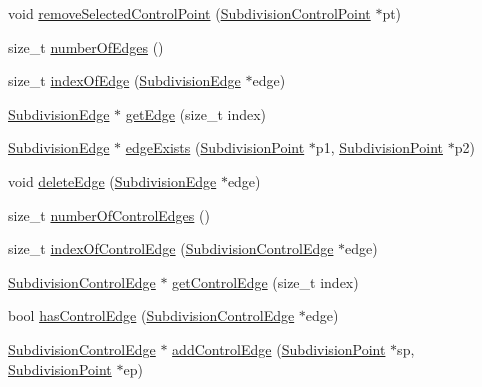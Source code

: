 \begin{DoxyCompactItemize}
\item 
void \hyperlink{classShipCAD_1_1SubdivisionSurface_a5be891c06dc5e441511fbdb73d71efeb}{remove\-Selected\-Control\-Point} (\hyperlink{classShipCAD_1_1SubdivisionControlPoint}{Subdivision\-Control\-Point} $\ast$pt)
\item 
size\-\_\-t \hyperlink{classShipCAD_1_1SubdivisionSurface_a74c607d9835c69a00b7730fad5384037}{number\-Of\-Edges} ()
\item 
size\-\_\-t \hyperlink{classShipCAD_1_1SubdivisionSurface_aa3d68eacb2fafd9dab6d40c3230ed991}{index\-Of\-Edge} (\hyperlink{classShipCAD_1_1SubdivisionEdge}{Subdivision\-Edge} $\ast$edge)
\item 
\hyperlink{classShipCAD_1_1SubdivisionEdge}{Subdivision\-Edge} $\ast$ \hyperlink{classShipCAD_1_1SubdivisionSurface_a67e69fc54ca38627596efc49b6d82e7f}{get\-Edge} (size\-\_\-t index)
\item 
\hyperlink{classShipCAD_1_1SubdivisionEdge}{Subdivision\-Edge} $\ast$ \hyperlink{classShipCAD_1_1SubdivisionSurface_adfdeabdc19eb55a7ba4ab0b607207300}{edge\-Exists} (\hyperlink{classShipCAD_1_1SubdivisionPoint}{Subdivision\-Point} $\ast$p1, \hyperlink{classShipCAD_1_1SubdivisionPoint}{Subdivision\-Point} $\ast$p2)
\item 
void \hyperlink{classShipCAD_1_1SubdivisionSurface_abb5beb9a6fc413e8d713e18fb39bf2ba}{delete\-Edge} (\hyperlink{classShipCAD_1_1SubdivisionEdge}{Subdivision\-Edge} $\ast$edge)
\item 
size\-\_\-t \hyperlink{classShipCAD_1_1SubdivisionSurface_a2fd710a2e2fa0272b8c8f498b8fc4f56}{number\-Of\-Control\-Edges} ()
\item 
size\-\_\-t \hyperlink{classShipCAD_1_1SubdivisionSurface_ae2f4e931f0134f8637e0aa769dba1d32}{index\-Of\-Control\-Edge} (\hyperlink{classShipCAD_1_1SubdivisionControlEdge}{Subdivision\-Control\-Edge} $\ast$edge)
\item 
\hyperlink{classShipCAD_1_1SubdivisionControlEdge}{Subdivision\-Control\-Edge} $\ast$ \hyperlink{classShipCAD_1_1SubdivisionSurface_ac7d6762dc83f1f114c1d7f4e67d8f8eb}{get\-Control\-Edge} (size\-\_\-t index)
\item 
bool \hyperlink{classShipCAD_1_1SubdivisionSurface_a9856bef9e5b2de9be4a3118fa80d0f16}{has\-Control\-Edge} (\hyperlink{classShipCAD_1_1SubdivisionControlEdge}{Subdivision\-Control\-Edge} $\ast$edge)
\item 
\hyperlink{classShipCAD_1_1SubdivisionControlEdge}{Subdivision\-Control\-Edge} $\ast$ \hyperlink{classShipCAD_1_1SubdivisionSurface_a976358235d20a0fdc83248948bb9cf48}{add\-Control\-Edge} (\hyperlink{classShipCAD_1_1SubdivisionPoint}{Subdivision\-Point} $\ast$sp, \hyperlink{classShipCAD_1_1SubdivisionPoint}{Subdivision\-Point} $\ast$ep)

\end{DoxyCompactItemize}
